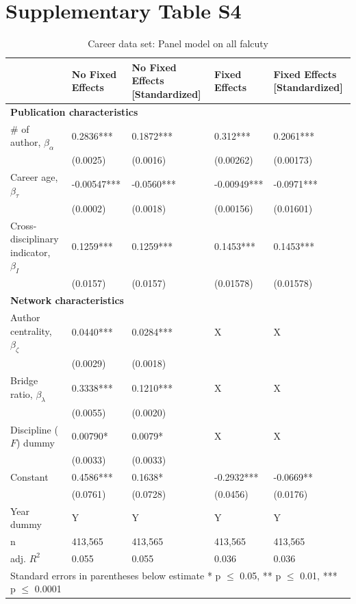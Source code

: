 \documentclass[10pt]{article}          %
\begin{document}
\section{Supplementary Table S4}
\begin{table}[H]
\begin{tabular}{m{5cm} m{3.0cm} m{3cm} m{2.5cm} m{2.7cm}}
\hline
\hline
& \textbf{No Fixed Effects} & \textbf{No Fixed Effects [Standardized]} & \textbf{Fixed Effects} & \textbf{Fixed Effects [Standardized]} \\ \hline
\multicolumn{5}{l}{\textbf{Publication characteristics}} \\
\rowcolor{lightgray}
{\# of author, $\beta_\alpha$} & 0.2836*** & 0.1872*** & 0.312*** & 0.2061*** \\
                             & (0.0025) & (0.0016) & (0.00262) & (0.00173) \\
\rowcolor{lightgray}
{Career age, $\beta_\tau$} & -0.00547*** & -0.0560*** & -0.00949*** & -0.0971*** \\
                         & (0.0002) & (0.0018) & (0.00156) & (0.01601) \\
\rowcolor{lightgray}
{Cross-disciplinary indicator, $\beta_I$} & 0.1259*** & 0.1259*** & 0.1453*** & 0.1453*** \\
                                        & (0.0157) & (0.0157) & (0.01578) & (0.01578) \\ \hline
\multicolumn{5}{l}{\textbf{Network characteristics}} \\
\rowcolor{lightgray}
{Author centrality, $\beta_\zeta$} & 0.0440*** & 0.0284*** & X & X \\
                             & (0.0029) & (0.0018) &  &  \\
\rowcolor{lightgray}
{Bridge ratio, $\beta_\lambda$} & 0.3338*** & 0.1210*** & X & X \\
                             & (0.0055) & (0.0020) &  &  \\
\rowcolor{lightgray}
{Discipline ($F$) dummy}     & 0.00790* & 0.0079* & X & X \\
                             & (0.0033) & (0.0033) & &  \\
\rowcolor{lightgray}
{Constant}                 & 0.4586*** & 0.1638* & -0.2932*** & -0.0669** \\
                         & (0.0761) & (0.0728) & (0.0456) & (0.0176) \\
\rowcolor{lightgray}
{Year dummy}            & Y & Y & Y & Y \\ \hline
\rowcolor{lightgray}
{n}                      & 413,565 & 413,565 & 413,565 & 413,565 \\
\rowcolor{lightgray}
{adj. $R^2$}             & 0.055 & 0.055 & 0.036 & 0.036 \\ \hline \hline
\multicolumn{5}{l}{\footnotesize{Standard errors in parentheses below estimate * p $\leq$ 0.05, ** p $\leq$ 0.01, *** p $\leq$ 0.0001}}

\end{tabular}
\caption{Career data set: Panel model on all falcuty}
\label{tbl:sT5}
\end{table}
\end{document}
